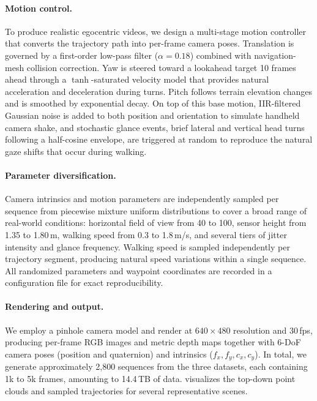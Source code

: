 \paragraph{Motion control.}
To produce realistic egocentric videos, we design a multi-stage motion controller that converts the trajectory path into per-frame camera poses. Translation is governed by a first-order low-pass filter ($\alpha{=}0.18$) combined with navigation-mesh collision correction. Yaw is steered toward a lookahead target 10 frames ahead through a $\tanh$-saturated velocity model that provides natural acceleration and deceleration during turns. Pitch follows terrain elevation changes and is smoothed by exponential decay. On top of this base motion, IIR-filtered Gaussian noise is added to both position and orientation to simulate handheld camera shake, and stochastic glance events, \ie brief lateral and vertical head turns following a half-cosine envelope, are triggered at random to reproduce the natural gaze shifts that occur during walking.

\paragraph{Parameter diversification.}
Camera intrinsics and motion parameters are independently sampled per sequence from piecewise mixture uniform distributions to cover a broad range of real-world conditions: horizontal field of view from 40\textdegree{} to 100\textdegree, sensor height from 1.35 to 1.80\,m, walking speed from 0.3 to 1.8\,m/s, and several tiers of jitter intensity and glance frequency. Walking speed is sampled independently per trajectory segment, producing natural speed variations within a single sequence. All randomized parameters and waypoint coordinates are recorded in a configuration file for exact reproducibility.

\paragraph{Rendering and output.}
We employ a pinhole camera model and render at $640{\times}480$ resolution and 30\,fps, producing per-frame RGB images and metric depth maps together with 6-DoF camera poses (position and quaternion) and intrinsics ($f_x, f_y, c_x, c_y$). In total, we generate approximately 2{,}800 sequences from the three datasets, each containing 1k to 5k frames, amounting to 14.4\,TB of data.  visualizes the top-down point clouds and sampled trajectories for several representative scenes.



